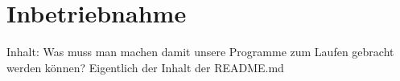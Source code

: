 \chapter{Inbetriebnahme}
\label{chap:betrieb}
Inhalt:
Was muss man machen damit unsere Programme zum Laufen gebracht werden können?
Eigentlich der Inhalt der README.md
